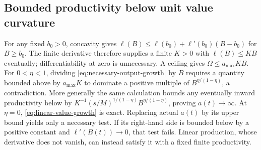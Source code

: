 \documentclass[11pt,a4paper]{article}
\theoremstyle{definition}\newtheorem{definition}{Definition}
\begin{document}
\subsection{Bounded productivity below unit value curvature}
\label{app:ceiling-growth-proof}
For any fixed $b_0>0$, concavity gives
$\ell(B)\leq\ell(b_0)+\ell'(b_0)(B-b_0)$ for $B\geq b_0$.
The finite derivative therefore supplies a finite $K>0$ with
$\ell(B)\leq KB$ eventually; differentiability at zero is unnecessary.
A ceiling gives $\Omega\leq a_{\max}KB$. For $0<\eta<1$, dividing
\cref{eq:necessary-output-growth} by $B$ requires a quantity bounded
above by $a_{\max}K$ to dominate a positive multiple of
$B^{\eta/(1-\eta)}$, a contradiction. More generally the same calculation
bounds any eventually inward productivity below by
$K^{-1}(s/M)^{1/(1-\eta)}B^{\eta/(1-\eta)}$, proving $a(t)\to\infty$.
At $\eta=0$, \cref{eq:linear-value-growth} is exact. Replacing actual
$a(t)$ by its upper bound yields only a necessary test. If its right-hand
side is bounded below by a positive constant and $\ell'(B(t))\to0$,
that test fails. Linear production, whose derivative does not vanish,
can instead satisfy it with a fixed finite productivity.
\end{document}
